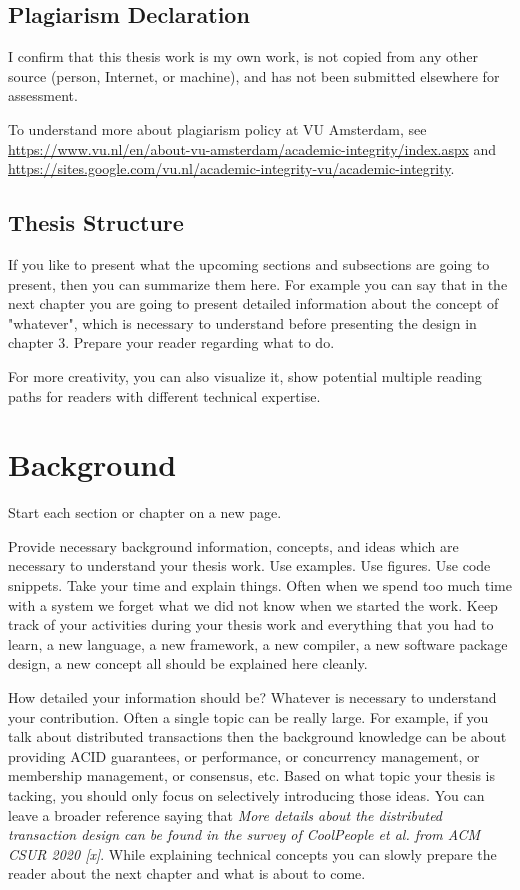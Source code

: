 \documentclass[11pt]{article}
\begin{document}
\subsection{Plagiarism Declaration}
I confirm that this thesis work is my own work, is not copied from any other source (person, Internet, or machine), and has not been submitted elsewhere for assessment. 

To understand more about plagiarism policy at VU Amsterdam, see \url{https://www.vu.nl/en/about-vu-amsterdam/academic-integrity/index.aspx} and \url{https://sites.google.com/vu.nl/academic-integrity-vu/academic-integrity}. 

\subsection{Thesis Structure}
If you like to present what the upcoming sections and subsections are  going to present, then you can summarize them here. For example you can say that in the next chapter you are going to present detailed  information about the concept of "whatever", which is necessary to understand before presenting the design in chapter 3. Prepare your reader regarding what to do. 

For more creativity, you can also visualize it, show potential multiple reading paths for readers with different technical expertise. 

\newpage 
\section{Background} 
Start each section or chapter on a new page. 

Provide necessary background information, concepts, and ideas which are necessary to understand your thesis work. Use examples. Use figures. Use code snippets. Take your time and explain things. Often when we spend too much time with a system we forget what we did not know when we started the work. Keep track of your activities during your thesis work and everything that you had to learn, a new language, a new framework, a new compiler, a new software package design, a new concept all should be explained here cleanly. 


How detailed your information should be? Whatever is necessary to understand your contribution. Often a single topic can be really large. For example, if you talk about distributed transactions then the background knowledge can be about providing ACID guarantees, or performance, or concurrency management, or membership management, or consensus, etc. Based on what topic your thesis is tacking, you should only focus on selectively introducing those ideas. You can leave a broader reference saying that \textit{More details about the distributed transaction design can be found in the survey of CoolPeople et al. from ACM CSUR 2020 [x]}. While explaining technical concepts you can slowly prepare the reader about the next chapter and what is about to come. 
\end{document}

